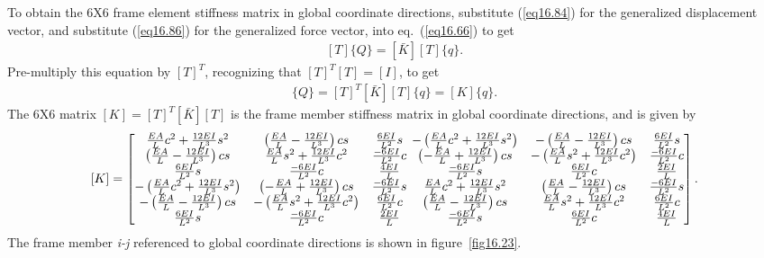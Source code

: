 \documentclass{AeroStructure-ERJohnson}
\begin{document}
To obtain the 6X6 frame element stiffness matrix in global coordinate directions, substitute (\ref{eq16.84}) for the generalized displacement vector, and substitute (\ref{eq16.86}) for the generalized force vector, into eq.~(\ref{eq16.66}) to get
\begin{align}\label{eq16.88}
[T]\{Q\}=[\bar{K}][T]\{q\}.
\end{align}
Pre-multiply this equation by $[T]^{T}$, recognizing that $[T]^{T}[T]=[I]$, to get
\begin{align}\label{eq16.89}
\{Q\}=[T]^{T}[\bar{K}][T]\{q\}=[K]\{q\}.
\end{align}
The 6X6 matrix $[K]=[T]^{T}[\bar{K}][T]$ is the frame member stiffness matrix in global coordinate directions, and is given by
\begin{align}\label{eq16.90}
[K]=\left[\begin{array}{@{}ccc@{}}\frac{E A}{L} c^{2}+\frac{12 E I}{L^{3}} s^{2} & \left(\frac{E A}{L}-\frac{12 E I}{L^{3}}\right) c s & \frac{6 E I}{L^{2}} s \\\left(\frac{E A}{L}-\frac{12 E I}{L^{3}}\right) c s & \frac{E A}{L} s^{2}+\frac{12 E I}{L^{3}} c^{2} & \frac{-6 E I}{L^{2}} c \\\frac{6 E I}{L^{2}} s & \frac{-6 E I}{L^{2}} c & \frac{4 E I}{L} \\-\left(\frac{E A}{L} c^{2}+\frac{12 E I}{L^{3}} s^{2}\right) & \left(-\frac{E A}{L}+\frac{12 E I}{L^{3}}\right) c s & \frac{-6 E I}{L^{2}} s \\-\left(\frac{E A}{L}-\frac{12 E I}{L^{3}}\right) c s & -\left(\frac{E A}{L} s^{2}+\frac{12 E I}{L^{3}} c^{2}\right) & \frac{6 E I}{L^{2}} c \\\frac{6 E I}{L^{2}} s & \frac{-6 E I}{L^{2}} c & \frac{2 E I}{L}\end{array}\right.\left.\begin{array}{@{}ccc@{}}-\left(\frac{E A}{L} c^{2}+\frac{12 E I}{L^{3}} s^{2}\right) & -\left(\frac{E A}{L}-\frac{12 E I}{L^{3}}\right) c s & \frac{6 E I}{L^{2}} s \\\left(-\frac{E A}{L}+\frac{12 E I}{L^{3}}\right) c s & -\left(\frac{E A}{L} s^{2}+\frac{12 E I}{L^{3}} c^{2}\right) & \frac{-6 E I}{L^{2}} c \\\frac{-6 E I}{L^{2}} s & \frac{6 E I}{L^{2}} c & \frac{2 E I}{L} \\\frac{E A}{L} c^{2}+\frac{12 E I}{L^{3}} s^{2} & \left(\frac{E A}{L}-\frac{12 E I}{L^{3}}\right) c s & \frac{-6 E I}{L^{2}} s \\\left(\frac{E A}{L}-\frac{12 E I}{L^{3}}\right) c s & \frac{E A}{L} s^{2}+\frac{12 E I}{L^{3}} c^{2} & \frac{6 E I}{L^{2}} c \\\frac{-6 E I}{L^{2}} s & \frac{6 E I}{L^{2}} c & \frac{4 E I}{L}\end{array}\right].
\end{align}
The frame member \textit{i-j} referenced to global coordinate directions is shown in figure~\ref{fig16.23}.
\end{document}
